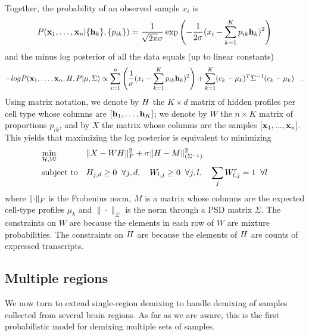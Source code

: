 \documentclass{article} %
\newcommand{\W}{W}
\begin{document}
Together, the probability of an observed sample $x_i$ is
\begin{equation*}
    P(\mathbf{x}_1,\ldots,\mathbf{x}_n | \{\mathbf{h}_k\}, \{p_{ik}\}) =  \frac{1}{\sqrt{2\pi}\sigma} \exp\left(-\frac{1}{2\sigma} (x_i - \sum_{k=1}^K p_{ik} \mathbf{h}_k)^2 \right)
\end{equation*}
and the minus log posterior of all the data equals (up to linear constants)
\begin{equation*}
    - log P(\mathbf{x}_1,\ldots,\mathbf{x}_n, {H}, P| \mu, \Sigma) \propto
    \sum_{i=1}^n \left({ \frac{1}{\sigma} (x_i - \sum_{k=1}^K p_{ik} \mathbf{h}_k)^2 }\right)
     + \sum_{k=1}^K (c_k-\mu_k)^T\Sigma^{-1}(c_k-\mu_k) \quad.
\end{equation*}
Using matrix notation, we denote by ${H}$ the $K \times d$ matrix of hidden profiles per cell type whose columns are $\left[{\mathbf{h}_1, \ldots, \mathbf{h}_K}\right]$; we denote by $W$ the $n \times K$ matrix of proportions $p_{ik}$,
and by $X$ the matrix whose columns are the samples $\left[{\mathbf{x}_1,..., \mathbf{x}_n}\right]$. This yields that maximizing the log posterior is equivalent to minimizing 
\begin{equation}
    \label{eq-single}
    \begin{aligned}
        & \underset{\cal{{H}},\cal{W}}{\text{min}}  
        & & \|{X - W {H}}\|_F^2 + \sigma \|{ {H} - M }\|^2_{(\Sigma^{-1})}\\
            & \text{subject to} &
            &  H_{j,d} \geq 0 \;\;\forall j,d , \quad W_{l,j} \geq 0 \;\; \forall j,l ,\quad \sum_j W^r_{l,j} = 1 \;\; \forall l \\
        \end{aligned}
\end{equation}
where $\|{\cdot}\|_F$ is the Frobenius norm, $M$ is a matrix whose columns are the expected cell-type profiles $\mu_k$ and  $\|\cdot\|_{\Sigma}$ is the norm through a PSD matrix $\Sigma$. The constraints on $\W$ are because the elements in each row of $\W$ are mixture probabilities. The constraints on ${H}$ are because the elements of ${H}$ are counts of expressed transcripts.

\subsection{Multiple regions}
We now turn to extend single-region demixing to handle demixing of samples collected from several brain regions. 
As far as we are aware, this is the first probabilistic model for demixing multiple sets of samples.
\end{document}
